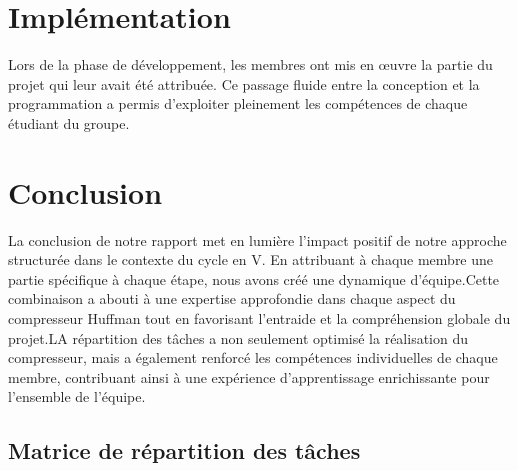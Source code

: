 \documentclass[12pt]{article}
\begin{document}
\section{Implémentation}
Lors de la phase de développement, les membres ont mis en œuvre la partie du projet qui leur avait été attribuée. Ce passage fluide entre la conception et la programmation a permis d'exploiter pleinement les compétences de chaque étudiant du groupe.


\section{Conclusion}
La conclusion de notre rapport met en lumière l'impact positif de notre approche structurée dans le contexte du cycle en V. En attribuant à chaque membre une partie spécifique à chaque étape, nous avons créé une dynamique d'équipe.Cette combinaison a abouti à une expertise approfondie dans chaque aspect du compresseur Huffman tout en favorisant l'entraide et la compréhension globale du projet.LA répartition des tâches  a non seulement optimisé la réalisation du compresseur, mais a également renforcé les compétences individuelles de chaque membre, contribuant ainsi à une expérience d'apprentissage enrichissante pour l'ensemble de l'équipe.

\subsection{Matrice de répartition des tâches}
\end{document}
